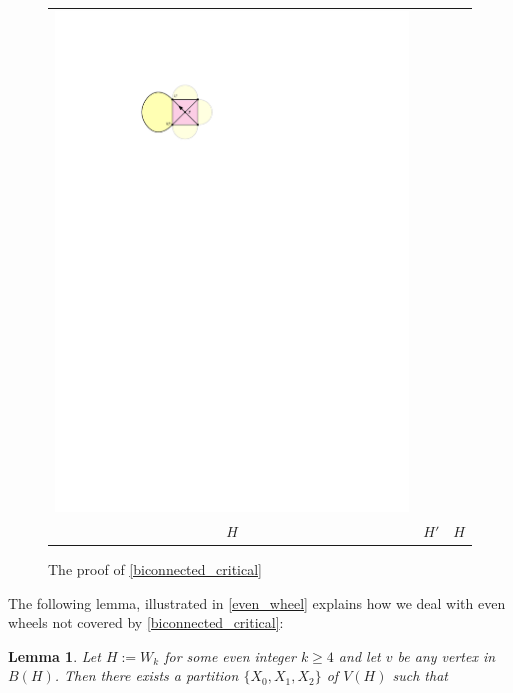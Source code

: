 \documentclass[a4paper,UKenglish,cleveref, autoref, thm-restate]{lipics-v2021}
\newtheorem{lem}{Lemma}
\newcommand{\pat}[1]{[\textcolor{red}{PM: #1}]}
\begin{document}
\begin{figure}
\begin{tabular}{ccc}
    \includegraphics[page=3]{figs/biconnected} \\
    $H$ & $H'$ & $H$
  \end{tabular}
  \caption{The proof of \cref{biconnected_critical}}
  \label{contraction_proof}
\end{figure}



The following lemma, illustrated in \cref{even_wheel}
 explains how we deal with even wheels not covered by \cref{biconnected_critical}:

\begin{lem}\label{wheelie}
  Let $H:=W_k$ for some even integer $k\ge 4$ and let $v$ be any vertex in $B(H)$.  Then there exists a partition $\{X_0,X_1,X_2\}$ of $V(H)$ such that
\end{lem}
\end{document}

